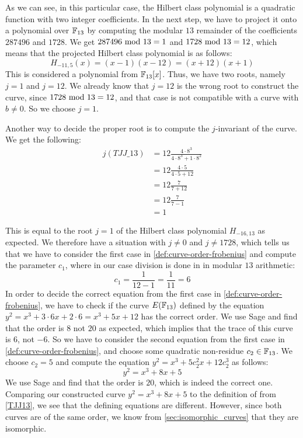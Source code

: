 \begin{example}
As we can see, in this particular case, the Hilbert class polynomial is a quadratic function with two integer coefficients. In the next step, we have to project it onto a polynomial over $\mathbb{F}_{13}$ by computing the modular $13$ remainder of the coefficients $287496$ and $1728$. We get $287496 \text{ mod } 13=1$ and $1728 \text{ mod } 13=12$, which means that the projected Hilbert class polynomial is as follows:
$$
H_{-11,5}(x)=(x-1)(x-12)= (x+12)(x+1)
$$ 
This is considered a polynomial from $\mathbb{F}_{13}[x]$. Thus, we have two roots, namely $j=1$ and $j=12$. We already know that $j=12$ is the wrong root to construct the  curve, since $1728 \text{ mod } 13=12$, and that case is not compatible with a curve with $b\neq 0$. So we choose $j=1$.

Another way to decide the proper root is to compute the $j$-invariant of the  curve. We get the following:
\begin{align*}
j(\mathit{TJJ\_13}) & = 12\frac{4\cdot 8^3}{4\cdot 8^3+ 1\cdot 8^2}\\
                    & = 12\frac{4\cdot 5}{4\cdot 5+ 12}\\
                    & = 12\frac{7}{7+ 12}\\
                    & = 12\frac{7}{7-1}\\
                    & = 1
\end{align*}

This is equal to the root $j=1$ of the Hilbert class polynomial $H_{-16,13}$ as expected. We therefore have a situation with $j\neq 0$ and $j\neq 1728$, which tells us that we have to consider the first case in \ref{def:curve-order-frobenius} and compute the parameter $c_1$, where in our case division is done in in modular $13$ arithmetic:
$$
c_1=\frac{1}{12-1} = \frac{1}{11} =6
$$
In order to decide the correct equation from the first case in \ref{def:curve-order-frobenius}, we have to check if the curve $E(\mathbb{F}_{13})$ defined by the  equation  $y^2 = x^3 + 3\cdot 6 x + 2\cdot 6 = x^3 + 5x +12$ has the correct order. We use Sage and find that the order is $8$ not $20$ as expected, which implies that the trace of this curve is $6$, not $-6$. So we have to consider the second equation from the first case in \ref{def:curve-order-frobenius}, and choose some quadratic non-residue $c_2\in\mathbb{F}_{13}$. We choose $c_2=5$ and compute the  equation $y^2 = x^3 + 5 c_2^2 x + 12 c_2^3$ as follows:
$$
y^2 = x^3 + 8 x + 5
$$
We use Sage and find that the order is $20$, which is indeed the correct one. Comparing our constructed curve $y^2 =  x^3 + 8x + 5$ to the definition of \TJJ{} from \examplename{} \ref{TJJ13}, we see that the defining equations are different. However, since both curves are of the same order, we know from \ref{sec:isomorphic_curves} that they are isomorphic.


\end{example}
